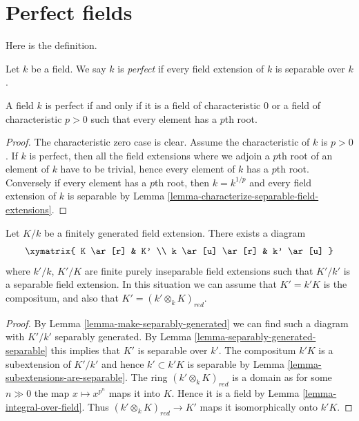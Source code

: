 \section{Perfect fields}
\label{section-perfect-fields}

\noindent
Here is the definition.

\begin{definition}
\label{definition-perfect}
Let $k$ be a field. We say $k$ is {\it perfect}
if every field extension of $k$ is separable over $k$.
\end{definition}

\begin{lemma}
\label{lemma-perfect}
A field $k$ is perfect if and only if it is a field of characteristic $0$
or a field of characteristic $p > 0$ such that every element has a $p$th
root.
\end{lemma}

\begin{proof}
The characteristic zero case is clear.
Assume the characteristic of $k$ is $p > 0$.
If $k$ is perfect, then all the field extensions where we adjoin
a $p$th root of an element of $k$ have to be trivial, hence every
element of $k$ has a $p$th root. Conversely if every element has a $p$th
root, then $k = k^{1/p}$ and every field extension of $k$ is
separable by
Lemma \ref{lemma-characterize-separable-field-extensions}.
\end{proof}

\begin{lemma}
\label{lemma-make-separable}
Let $K/k$ be a finitely generated field extension.
There exists a diagram
$$
\xymatrix{
K \ar[r] & K' \\
k \ar[u] \ar[r] & k' \ar[u]
}
$$
where $k'/k$, $K'/K$ are finite purely inseparable field
extensions such that $K'/k'$ is a separable field extension.
In this situation we can assume that $K' = k'K$ is the compositum,
and also that $K' = (k' \otimes_k K)_{red}$.
\end{lemma}

\begin{proof}
By Lemma \ref{lemma-make-separably-generated}
we can find such a diagram with $K'/k'$ separably generated.
By
Lemma \ref{lemma-separably-generated-separable}
this implies that $K'$ is separable over $k'$.
The compositum $k'K$ is a subextension of $K'/k'$ and hence
$k' \subset k'K$ is separable by
Lemma \ref{lemma-subextensions-are-separable}.
The ring $(k' \otimes_k K)_{red}$ is a domain as for some
$n \gg 0$ the map $x \mapsto x^{p^n}$ maps it into $K$.
Hence it is a field by
Lemma \ref{lemma-integral-over-field}.
Thus $(k' \otimes_k K)_{red} \to K'$ maps it isomorphically onto $k'K$.
\end{proof}

